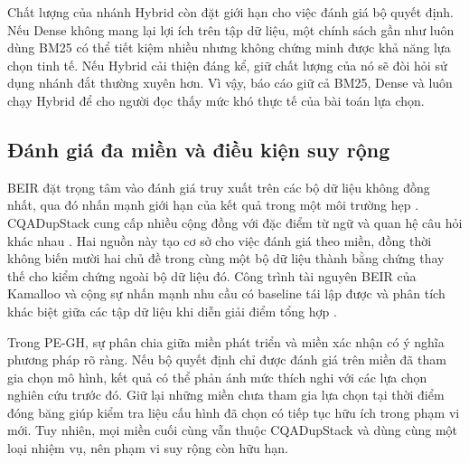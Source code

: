 Chất lượng của nhánh Hybrid còn đặt giới hạn cho việc đánh giá bộ quyết định. Nếu Dense không mang lại lợi ích trên tập dữ liệu, một chính sách gần như luôn dùng BM25 có thể tiết kiệm nhiều nhưng không chứng minh được khả năng lựa chọn tinh tế. Nếu Hybrid cải thiện đáng kể, giữ chất lượng của nó sẽ đòi hỏi sử dụng nhánh đắt thường xuyên hơn. Vì vậy, báo cáo giữ cả BM25, Dense và luôn chạy Hybrid để cho người đọc thấy mức khó thực tế của bài toán lựa chọn.

\subsection{Đánh giá đa miền và điều kiện suy rộng}
BEIR đặt trọng tâm vào đánh giá truy xuất trên các bộ dữ liệu không đồng nhất, qua đó nhấn mạnh giới hạn của kết quả trong một môi trường hẹp \cite{beir2021}. CQADupStack cung cấp nhiều cộng đồng với đặc điểm từ ngữ và quan hệ câu hỏi khác nhau \cite{cqadupstack2015}. Hai nguồn này tạo cơ sở cho việc đánh giá theo miền, đồng thời không biến mười hai chủ đề trong cùng một bộ dữ liệu thành bằng chứng thay thế cho kiểm chứng ngoài bộ dữ liệu đó. Công trình tài nguyên BEIR của Kamalloo và cộng sự nhấn mạnh nhu cầu có baseline tái lập được và phân tích khác biệt giữa các tập dữ liệu khi diễn giải điểm tổng hợp \cite{beir_resources2024}.

Trong PE-GH, sự phân chia giữa miền phát triển và miền xác nhận có ý nghĩa phương pháp rõ ràng. Nếu bộ quyết định chỉ được đánh giá trên miền đã tham gia chọn mô hình, kết quả có thể phản ánh mức thích nghi với các lựa chọn nghiên cứu trước đó. Giữ lại những miền chưa tham gia lựa chọn tại thời điểm đóng băng giúp kiểm tra liệu cấu hình đã chọn có tiếp tục hữu ích trong phạm vi mới. Tuy nhiên, mọi miền cuối cùng vẫn thuộc CQADupStack và dùng cùng một loại nhiệm vụ, nên phạm vi suy rộng còn hữu hạn.

